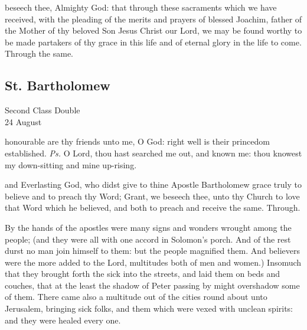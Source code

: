 \vspace{-0.25\baselineskip}

\postcommunion
{} beseech thee, Almighty God: that through these sacraments which we have received, with the pleading of the merits and prayers of blessed Joachim, father of the Mother of thy beloved Son Jesus Christ our Lord, we may be found worthy to be made partakers of thy grace in this life and of eternal glory in the life to come. Through the same.


\subsection{St. Bartholomew}
\begin{inhead}
    {Second Class Double\\
24 August}
\end{inhead}

\vspace{-0.25\baselineskip}

\introit
{} honourable are thy friends unto me, O God: right well is their princedom established. \textit{Ps.} O Lord, thou hast searched me out, and known me: thou knowest my down-sitting and mine up-rising.

\vspace{-0.25\baselineskip}

\collect
{} and Everlasting God, who didst give to thine Apostle Bartholomew grace truly to believe and to preach thy Word; Grant, we beseech thee, unto thy Church to love that Word which he believed, and both to preach and receive the same. Through.

\vspace{-0.25\baselineskip}

 By the hands of the apostles were many signs and wonders wrought among the people; (and they were all with one accord in Solomon's porch. And of the rest durst no man join himself to them: but the people magnified them. And believers were the more added to the Lord, multitudes both of men and women.) Insomuch that they brought forth the sick into the streets, and laid them on beds and couches, that at the least the shadow of Peter passing by might overshadow some of them. There came also a multitude out of the cities round about unto Jerusalem, bringing sick folks, and them which were vexed with unclean spirits: and they were healed every one.

